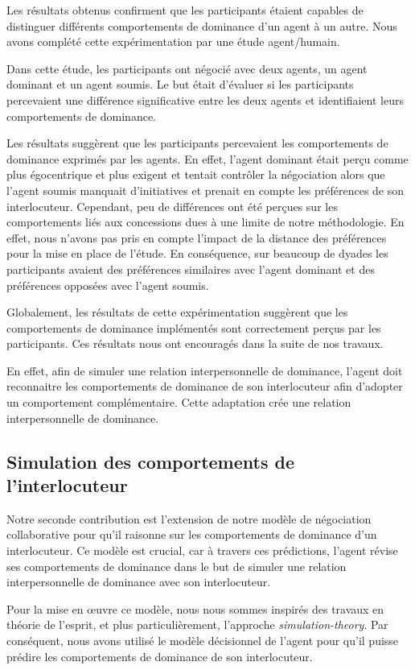 Les résultats obtenus confirment que les participants étaient capables de distinguer différents comportements de dominance d'un agent à un autre. Nous avons complété cette expérimentation par une étude agent/humain. 

Dans cette étude, les participants ont négocié avec deux agents, un agent dominant et un agent soumis. Le but était d'évaluer si les participants percevaient une différence significative entre les deux agents et identifiaient leurs comportements de dominance.

Les résultats suggèrent que les participants percevaient les comportements de dominance exprimés par les agents. En effet, l'agent dominant était perçu comme plus égocentrique et plus exigent et tentait contrôler la négociation alors que l'agent soumis manquait d'initiatives et prenait en compte les préférences de son interlocuteur. Cependant, peu de différences ont été perçues sur les comportements liés aux concessions dues à une limite de notre méthodologie. En effet, nous n'avons pas pris en compte l'impact de la distance des préférences pour la mise en place de l'étude. En conséquence, sur beaucoup de dyades les participants avaient des préférences similaires avec l'agent dominant et des préférences opposées avec l'agent soumis. 

Globalement, les résultats de cette expérimentation suggèrent que les comportements de dominance implémentés sont correctement perçus par les participants. Ces résultats nous ont encouragés dans la suite de nos travaux. 

En effet, afin de simuler une relation interpersonnelle de dominance, l'agent doit reconnaitre les comportements de dominance de son interlocuteur afin d'adopter un comportement complémentaire. Cette adaptation crée une relation interpersonnelle de dominance.  

\subsection{Simulation des comportements de l'interlocuteur}

Notre seconde contribution est l'extension de notre modèle de négociation collaborative pour qu'il raisonne sur les comportements de dominance d'un interlocuteur. Ce modèle est crucial, car à travers ces prédictions, l'agent révise ses comportements de dominance dans le but de simuler une relation interpersonnelle de dominance avec son interlocuteur. 

Pour la mise en œuvre ce modèle, nous nous sommes inspirés des travaux en théorie de l'esprit, et plus particulièrement, l'approche \emph{simulation-theory}. Par conséquent, nous avons utilisé le modèle décisionnel de l'agent pour qu'il puisse prédire les comportements de dominance de son interlocuteur. 

